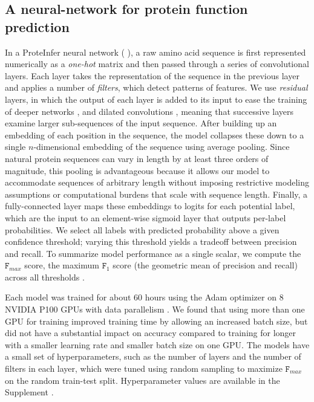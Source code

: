 \subsection*{A neural-network for protein function prediction}
In a ProteInfer neural network (%
), a raw amino acid sequence is first represented numerically as a \textit{one-hot} matrix and then passed through a series of convolutional layers. Each layer takes the representation of the sequence in the previous layer and applies a number of \textit{filters}, which detect patterns of features. We use \textit{residual} layers, in which the output of each layer is added to its input to ease the training of deeper networks \cite{resnet}, and dilated convolutions \cite{dilatedconvolutions}, meaning that successive layers examine larger sub-sequences of the input sequence. After building up an embedding of each position in the sequence, the model collapses these down to a single $n$-dimensional embedding of the sequence using average pooling. Since natural protein sequences can vary in length by at least three orders of magnitude, this pooling is advantageous because it allows our model to accommodate sequences of arbitrary length without imposing restrictive modeling assumptions or computational burdens that scale with sequence length. Finally, a fully-connected layer maps these embeddings to logits for each potential label, which are the input to an element-wise sigmoid layer that outputs per-label probabilities. 
We select all labels with predicted probability above a given confidence threshold; varying this threshold yields a tradeoff between precision and recall. To summarize model performance as a single scalar, we compute the $\texttt{F}_{max}$ score, the maximum $\texttt{F}_{1}$ score (the geometric mean of precision and recall) across all thresholds \citep{radivojac2013large}.  

Each model was trained for about 60 hours using the Adam optimizer \citep{kingma2014adam} on 8 NVIDIA P100 GPUs with data parallelism \cite{dean2012large, dataparalellism}.  We found that using more than one GPU for training improved training time by allowing an increased batch size, but did not have a substantial impact on accuracy compared to training for longer with a smaller learning rate and smaller batch size on one GPU. The models have a small set of hyperparameters, such as the number of layers and the number of filters in each layer, which were tuned using random sampling to maximize $\texttt{F}_{max}$ on the random train-test split. Hyperparameter values are available in the \textnormal{ Supplement}%
.
